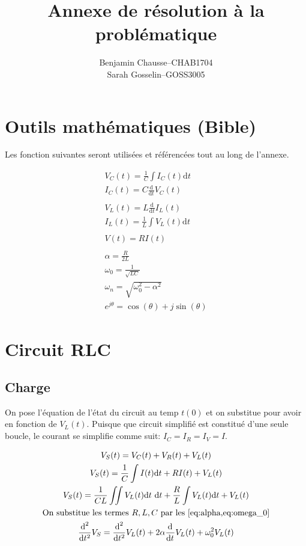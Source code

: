 \documentclass[a11paper, 11pt]{article}
\title{Annexe de résolution à la problématique}
\author{
  \addtolength{\tabcolsep}{-0.4em}
  \begin{tabular}{rcl} %
      Benjamin Chausse & -- & CHAB1704 \\
      Sarah Gosselin   & -- & GOSS3005 \\
  \end{tabular}
}
\newcommand{\dt}{\mathrm{d}t}
\newcommand{\ddt}[1]{\frac{\text{d}^{#1}}{\text{d}t^{#1}}}
\newcommand{\vlt}{V_L(t)}
\newcommand{\vct}{V_C(t)}
\newcommand{\vrt}{V_R(t)}
\newcommand{\vst}{V_S(t)}
\newcommand{\ilt}{I_L(t)}
\newcommand{\ict}{I_C(t)}
\newcommand{\al}{\alpha}
\newcommand{\wz}{\omega_{0}}
\newcommand{\ws}{\omega_{0}^2}
\begin{document}
\maketitle
\newpage

\begin{appendix}
	\section{Outils mathématiques (Bible)}
	\label{sec:bible}
	Les fonction suivantes seront utilisées et référencées tout au long de l'annexe.

	\begin{gather}
		\vct = \frac{1}{C}\int\ict \dt \label{eq:vct}\\
		\ict = C\frac{\text{d}}{\dt}\vct \label{eq:ict}\\
		\nonumber\\
		\vlt = L\frac{\text{d}}{\dt}\ilt \label{eq:vlt}\\
		\ilt = \frac{1}{L}\int \vlt\dt \label{eq:ilt}\\
		\nonumber\\
		V(t) = RI(t) \label{eq:vri}\\
		\nonumber\\
		\al = \frac{R}{2L} \label{eq:alpha}\\
		\wz = \frac{1}{\sqrt{LC}} \label{eq:omega_0}\\
		\omega_n = \sqrt{\ws  - \al^2 \label{eq:omega_n}} \\
		e^{j\theta} = \cos(\theta) + j\sin(\theta) \label{e:euler}
	\end{gather}

	\newpage
	\section{Circuit RLC}
	\subsection{Charge}
	On pose l'équation de l'état du circuit au temp $t(0)$ et on substitue pour
	avoir en fonction de $\vlt$.
	Puisque que circuit simplifié est constitué d'une seule boucle, le courant
	se simplifie comme suit: $I_C = I_R = I_V = I$.


	\begin{gather}
		\vst = \vct + \vrt + \vlt \label{eq:vst-initiale-charge}\\
		\vst = \frac{1}{C}\int I(t) \dt + RI(t) + \vlt \\
		\vst = \frac{1}{CL} \iint \vlt \dt\ \dt + \frac{R}{L}\int\vlt\dt + \vlt\\
		\nonumber \text{On substitue les termes $R, L, C$ par les \cref{eq:alpha,eq:omega_0}}\\
		\ddt{2}V_S = \ddt{2}\vlt + 2\al\ddt{}\vlt + \ws\vlt
	\end{gather}


\end{appendix}
\end{document}
